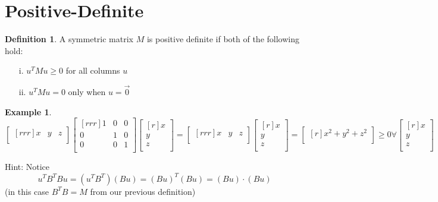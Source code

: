 \documentclass{report}
\theoremstyle{plain}
\theoremstyle{definition}
\newtheorem*{ex}{Example}
\newtheorem*{defn}{Definition}
\theoremstyle{plain}
\begin{document}
\section{Positive-Definite}
\begin{defn}
A symmetric matrix $M$ is positive definite if both of the following hold:
\begin{enumerate}
\item[i.] $u^TMu \geq 0$ for all columns $u$
\item[ii.] $u^TMu=0$ only when $u=\vec{0}$
\end{enumerate}
\end{defn}
\begin{ex}
\[ \begin{bmatrix}[rrr]x&y&z\\\end{bmatrix}\begin{bmatrix}[rrr]1&0&0\\0&1&0\\0&0&1\\\end{bmatrix}\begin{bmatrix}[r]x\\y\\z\\\end{bmatrix}
 = \begin{bmatrix}[rrr]x&y&z\\\end{bmatrix}\begin{bmatrix}[r]x\\y\\z\\\end{bmatrix} = \begin{bmatrix}[r]x^2+y^2+z^2\\\end{bmatrix} \geq 0 \forall \begin{bmatrix}[r]x\\y\\z\\\end{bmatrix} \]
\end{ex}
Hint: Notice 
\[ u^TB^TBu = (u^TB^T)(Bu) = (Bu)^T(Bu)=(Bu)\cdot (Bu) \]
 (in this case $B^TB=M$ from our previous definition) 
\end{document}
